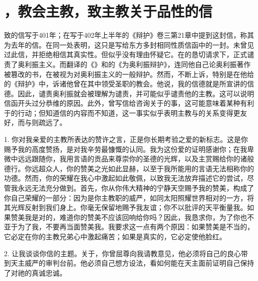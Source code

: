 
\section{，教会主教，致主教关于品性的信}

致的信写于401年；在写于402年上半年的《辩护》卷三第21章中提到这封信，称其为去年的信。在同一处表明，这只是写给东方多封相同性质信函中的一封。未曾见过此信，并拒绝相信其真实性。但似乎没有理由怀疑它。在的恳切请求下，正式谴责了奥利振主义。而翻译的《》和的《为奥利振辩护》，连同他自己论奥利振著作被篡改的书，在被视为对奥利振主义的一般辩护。然而，不断上诉，特别是在他给的《辩护》中，诉诸他曾在其中领受圣职的教会。他说，我的信德就是所宣讲的信德。因此，谴责奥利振就会被理解为谴责，并可能似乎谴责他的主教。这可以说明信函开头过分恭维的原因。此外，曾写信给咨询关于的事，这可能意味着某种有利于的行动；但知道信的内容而不知道，这一事实似乎表明主教与的关系变得更友好，而与则疏远了。\par

1. 你对我亲爱的主教所表达的赞许之言，正是你长期考验之爱的新标志。这是你赐予我的高度赞扬，是对我辛劳最慷慨的认同。我为这份爱的证明感谢你；在我卑微中远远跟随你，我用言语的贡品来尊崇你的圣德的光辉，以及主赏赐给你的诸般德行。你远超众人，你的赞美之光如此显赫，以至于我所能用的言语无法相称你的功德。然而，你的荣耀在我心中激起如此敬佩，以致我无法放弃描述它的尝试，尽管我永远无法充分做到。首先，你从你伟大精神的宁静天空赐予我的赞美，构成了你自己荣耀的一部分：因为是你主教职的威严，如同太阳照耀世界相对的一方，将其光辉反射到我们身上。你毫无保留地赐予我友谊；你不以批评的天平衡量我。如果赞美我是对的，难道你的赞美不应该回响给你吗？因此，我恳求你，为了你也不亚于为了我，不要再当面赞美我。我要求这一点有两个原因：如果赞美是不当的，它必定在你的主教兄弟心中激起痛苦；如果是真实的，它必定使他脸红。\par

2. 让我谈谈你信的主题。关于，你曾屈尊向我请教意见，他必须将自己的良心带到天主威严的审判台前。他必须自己想方设法，看如何能在天主面前证明自己保持了对祂的真诚忠诚。\par

